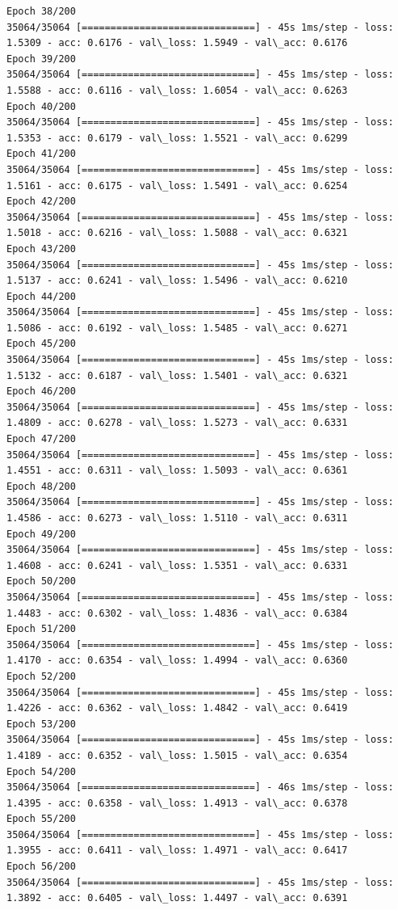 \documentclass[11pt]{article}
\begin{document}
\begin{Verbatim}[commandchars=\\\{\}]
Epoch 38/200
35064/35064 [==============================] - 45s 1ms/step - loss: 1.5309 - acc: 0.6176 - val\_loss: 1.5949 - val\_acc: 0.6176
Epoch 39/200
35064/35064 [==============================] - 45s 1ms/step - loss: 1.5588 - acc: 0.6116 - val\_loss: 1.6054 - val\_acc: 0.6263
Epoch 40/200
35064/35064 [==============================] - 45s 1ms/step - loss: 1.5353 - acc: 0.6179 - val\_loss: 1.5521 - val\_acc: 0.6299
Epoch 41/200
35064/35064 [==============================] - 45s 1ms/step - loss: 1.5161 - acc: 0.6175 - val\_loss: 1.5491 - val\_acc: 0.6254
Epoch 42/200
35064/35064 [==============================] - 45s 1ms/step - loss: 1.5018 - acc: 0.6216 - val\_loss: 1.5088 - val\_acc: 0.6321
Epoch 43/200
35064/35064 [==============================] - 45s 1ms/step - loss: 1.5137 - acc: 0.6241 - val\_loss: 1.5496 - val\_acc: 0.6210
Epoch 44/200
35064/35064 [==============================] - 45s 1ms/step - loss: 1.5086 - acc: 0.6192 - val\_loss: 1.5485 - val\_acc: 0.6271
Epoch 45/200
35064/35064 [==============================] - 45s 1ms/step - loss: 1.5132 - acc: 0.6187 - val\_loss: 1.5401 - val\_acc: 0.6321
Epoch 46/200
35064/35064 [==============================] - 45s 1ms/step - loss: 1.4809 - acc: 0.6278 - val\_loss: 1.5273 - val\_acc: 0.6331
Epoch 47/200
35064/35064 [==============================] - 45s 1ms/step - loss: 1.4551 - acc: 0.6311 - val\_loss: 1.5093 - val\_acc: 0.6361
Epoch 48/200
35064/35064 [==============================] - 45s 1ms/step - loss: 1.4586 - acc: 0.6273 - val\_loss: 1.5110 - val\_acc: 0.6311
Epoch 49/200
35064/35064 [==============================] - 45s 1ms/step - loss: 1.4608 - acc: 0.6241 - val\_loss: 1.5351 - val\_acc: 0.6331
Epoch 50/200
35064/35064 [==============================] - 45s 1ms/step - loss: 1.4483 - acc: 0.6302 - val\_loss: 1.4836 - val\_acc: 0.6384
Epoch 51/200
35064/35064 [==============================] - 45s 1ms/step - loss: 1.4170 - acc: 0.6354 - val\_loss: 1.4994 - val\_acc: 0.6360
Epoch 52/200
35064/35064 [==============================] - 45s 1ms/step - loss: 1.4226 - acc: 0.6362 - val\_loss: 1.4842 - val\_acc: 0.6419
Epoch 53/200
35064/35064 [==============================] - 45s 1ms/step - loss: 1.4189 - acc: 0.6352 - val\_loss: 1.5015 - val\_acc: 0.6354
Epoch 54/200
35064/35064 [==============================] - 46s 1ms/step - loss: 1.4395 - acc: 0.6358 - val\_loss: 1.4913 - val\_acc: 0.6378
Epoch 55/200
35064/35064 [==============================] - 45s 1ms/step - loss: 1.3955 - acc: 0.6411 - val\_loss: 1.4971 - val\_acc: 0.6417
Epoch 56/200
35064/35064 [==============================] - 45s 1ms/step - loss: 1.3892 - acc: 0.6405 - val\_loss: 1.4497 - val\_acc: 0.6391

\end{Verbatim}
\end{document}
